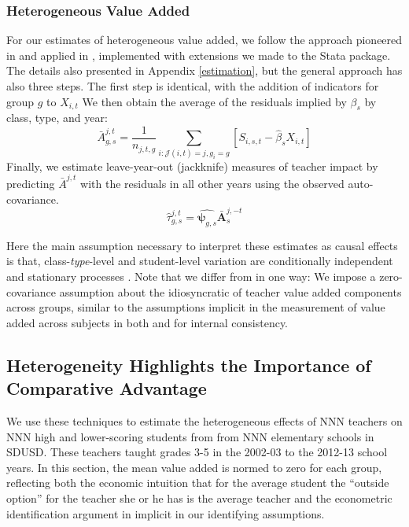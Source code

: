 \documentclass[12pt]{article}
\theoremstyle{definition}
\theoremstyle{definition}
\theoremstyle{definition}
\theoremstyle{definition}
\begin{document}
\subsubsection{Heterogeneous Value Added}

For our estimates of heterogeneous value added, we follow the approach pioneered in \citet{Delgado2020} and applied in \citet{bates2022teacher}, implemented with extensions we made to the \citet{vam_stata_ado} Stata package. The details also presented in Appendix \ref{estimation}, but the general approach has also three steps. The first step is identical, with the addition of indicators for group $g$ to $X_{i,t}$ We then obtain the average of the residuals implied by $\beta_s$ by class, type, and year:
\begin{equation}
\bar{A}^{j,t}_{g,s} = \frac{1}{n_{j,t,g}} \sum_{i:\mathcal{J}(i,t) = j,g_i=g} \left [ S_{i,s,t} - \hat{\beta}_s X_{i,t} \right ]\nonumber
\end{equation}
\noindent Finally, we estimate leave-year-out (jackknife) measures of teacher impact by predicting $\bar{A}^{j,t}$ with the residuals in all other years using the observed auto-covariance.  %
\begin{equation}
\hat{\tau}^{j,t}_{g,s} = \hat{\bm{\psi}_{g,s}} \bar{\bm{A}}^{j,-t}_s
\end{equation}

Here the main assumption necessary to interpret these estimates as causal effects is that, class-\textit{type}-level and student-level variation are conditionally independent and stationary processes \citep[as derrived in][---again formal details are in Appendix \ref{estimation}]{Delgado2020}. Note that we differ from \cite{Delgado2020} in one way: We impose a zero-covariance assumption about the idiosyncratic of teacher value added components across groups, similar to the assumptions implicit in the measurement of value added across subjects in both \citet{chetty2014measuring1} and \citet{Delgado2020} for internal consistency.


\subsection{Heterogeneity Highlights the Importance of Comparative Advantage} \label{va_results}

We use these techniques to estimate the heterogeneous effects of NNN teachers on NNN high and lower-scoring students from from NNN elementary schools in SDUSD. These teachers taught grades 3-5 in the 2002-03 to the 2012-13 school years. In this section, the mean value added is normed to zero for each group, reflecting both the economic intuition that for the average student the ``outside option'' for the teacher she or he has is the average teacher and the econometric identification argument in \citet{chetty2014measuring1} implicit in our identifying assumptions.
\end{document}
